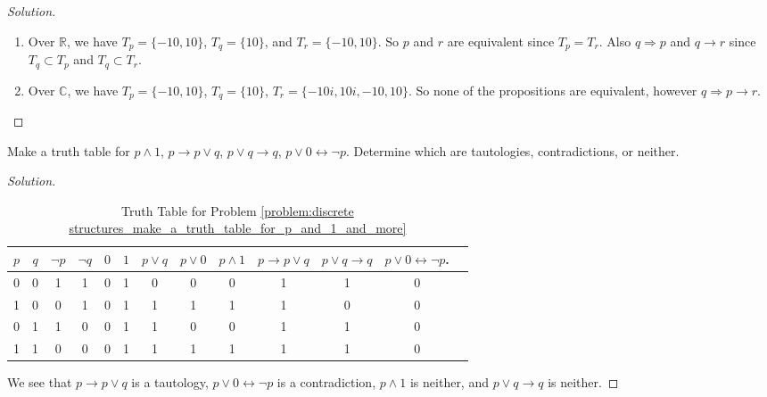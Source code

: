 \documentclass[../main.tex]{subfiles}
\begin{document}
\begin{proof}[Solution]
\
\begin{enumerate}
\item Over $\mathbb{R}$, we have $T_{p} = \{-10,10\}$, $T_{q} = \{10\}$, and $T_{r} = \{-10,10\}$. So $p$ and $r$ are equivalent since $T_{p} = T_{r}$. Also $q\Rightarrow p$ and $q\rightarrow r$ since $T_{q} \subset T_{p}$ and $T_{q}\subset T_{r}$.
\item Over $\mathbb{C}$, we have $T_{p} = \{-10,10\}$, $T_{q} = \{10\}$, $T_{r} = \{-10i,10i,-10,10\}$. So none of the propositions are equivalent, however $q\Rightarrow p \rightarrow r$.
\end{enumerate}
\end{proof}

\begin{problem}
\label{problem:discrete structures_make_a_truth_table_for_p_and_1_and_more}
Make a truth table for $p\land 1$, $p\rightarrow p\lor q$, $p\lor q \rightarrow q$, $p\lor 0 \leftrightarrow \neg p$. Determine which are tautologies, contradictions, or neither.
\end{problem}
\begin{proof}[Solution]
%
\begin{table}[H]
    \centering
    \begin{tabular}{c c c c c c c c c c c c c} 
         \hline 
         $p$ & $q$ & $\neg p$ & $\neg q$ & $0$ & $1$ & $p\lor q$ & $p \lor 0$ & $p\land 1$ & $p\rightarrow p\lor q$ & $p\lor q \rightarrow q$ & $p\lor 0 \leftrightarrow \neg p$.\\ [0.5ex] 
         \hline
         0 & 0 & 1 & 1 & 0 & 1 & 0 & 0 & 0 & 1 & 1 & 0 \\
         1 & 0 & 0 & 1 & 0 & 1 & 1 & 1 & 1 & 1 & 0 & 0 \\
         0 & 1 & 1 & 0 & 0 & 1 & 1 & 0 & 0 & 1 & 1 & 0 \\
         1 & 1 & 0 & 0 & 0 & 1 & 1 & 1 & 1 & 1 & 1 & 0 \\
         \hline
    \end{tabular}
    \caption{Truth Table for Problem \ref{problem:discrete structures_make_a_truth_table_for_p_and_1_and_more}}
    \label{tab:my_label}
\end{table}
%
We see that $p\rightarrow p\lor q$ is a tautology, $p\lor 0 \leftrightarrow \neg p$ is a contradiction, $p\land 1$ is neither, and $p\lor q \rightarrow q$ is neither. 
\end{proof}
\end{document}
